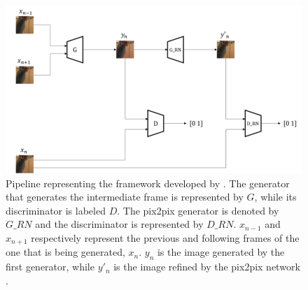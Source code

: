 \begin{figure}
	\centering
	\includegraphics[width=1.0\linewidth]{figures/VideoGANFramework}
	\caption{Pipeline representing the framework developed by \textcite{Tran2020}. The generator that generates the intermediate frame is represented by $G$, while its discriminator is labeled $D$. The pix2pix generator is denoted by $G\_RN$ and the discriminator is represented by $D\_RN$. $x_{n-1}$ and $x_{n+1}$ respectively represent the previous and following frames of the one that is being generated, $x_{n}$. $y_{n}$ is the image generated by the first generator, while $y'_{n}$ is the image refined by the pix2pix network \parencite{Tran2020}.}
	\label{fig:VideoGANFramework}
\end{figure}
